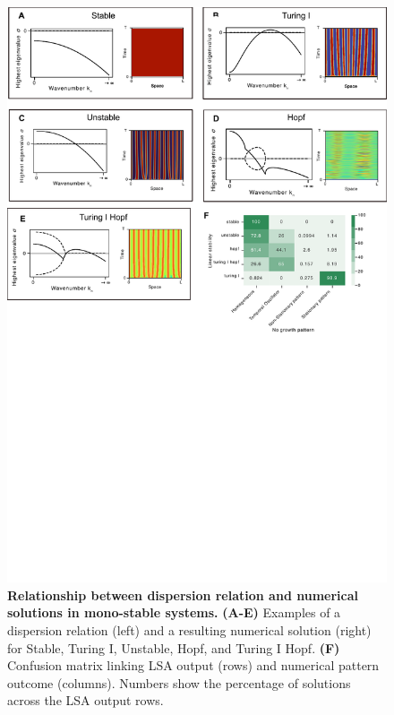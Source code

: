 \begin{figure}[H]
    \includegraphics[width=1\textwidth]{figures/dispersion} %
    \caption{\textbf{Relationship between dispersion relation and numerical solutions in mono-stable systems.} \textbf{(A-E)} Examples of a dispersion relation (left) and a resulting numerical solution (right) for Stable, Turing I, Unstable, Hopf, and Turing I Hopf. \textbf{(F)} Confusion matrix linking LSA output (rows) and numerical pattern outcome (columns). Numbers show the percentage of solutions across the LSA output rows.}
    \label{fig:dispersions} %
\end{figure}


